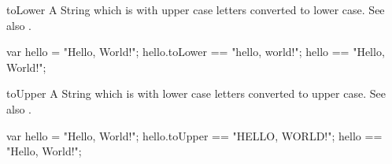 \begin{urbiscriptapi}
\item[toLower]%
  A String which is \this with upper case letters converted to lower case.
  See also .
\begin{urbiassert}
    var hello =  "Hello, World!";
hello.toLower == "hello, world!";
        hello == "Hello, World!";
\end{urbiassert}


\item[toUpper]
  A String which is \this with lower case letters converted to upper case.
  See also .
\begin{urbiassert}
    var hello =  "Hello, World!";
hello.toUpper == "HELLO, WORLD!";
        hello == "Hello, World!";
\end{urbiassert}
\end{urbiscriptapi}


